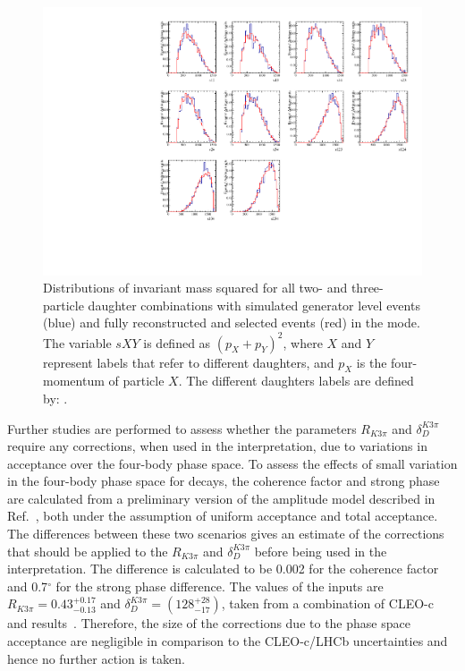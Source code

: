 \begin{figure}[h]
\centering
\includegraphics[width=0.9\linewidth]{figures/results/dalitzDist_PiPiPiPi.pdf}
\caption{Distributions of invariant mass squared for all two- and three-particle \Dz daughter combinations with simulated generator level events (blue) and fully reconstructed and selected events (red) in the \pipipipi mode. The variable $sXY$ is defined as $(p_X + p_Y)^2$, where $X$ and $Y$ represent labels that refer to different \Dz daughters, and $p_X$ is the four-momentum of particle $X$. The different \Dz daughters labels are defined by: .}
\label{dalitz4pi}
\end{figure}

Further studies are performed to assess whether the parameters $R_{K3\pi}$ and $\delta_D^{K3\pi}$ require any corrections, when used in the interpretation, due to variations in acceptance over the four-body phase space. To assess the effects of small variation in the four-body phase space for \kpipipi decays, the coherence factor and strong phase are calculated from a preliminary version of the \kpipipi amplitude model described in Ref.~\cite{LHCb-PAPER-2017-040}, both under the assumption of uniform acceptance and total \lhcb acceptance. The differences between these two scenarios gives an estimate of the corrections that should be applied to the $R_{K3\pi}$ and $\delta_D^{K3\pi}$ before being used in the \lhcb interpretation. The difference is calculated to be 0.002 for the coherence factor and 0.7$^{\circ}$ for the strong phase difference. The values of the inputs are $R_{K3\pi} = 0.43^{+0.17}_{-0.13}$ and $\delta_D^{K3\pi} = \left(128^{+28}_{-17}\right)$, taken from a combination of CLEO-c and \lhcb results~\cite{charmk3pi,charmk3pi_errata,LHCb-PAPER-2015-057}. Therefore, the size of the corrections due to the \lhcb phase space acceptance are negligible in comparison to the CLEO-c/LHCb uncertainties and hence no further action is taken.


